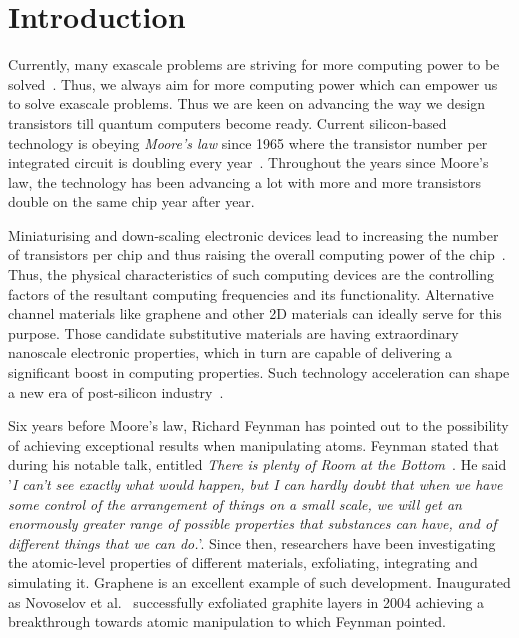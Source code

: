 \chapter{Introduction}
\label{introduction}

Currently, many exascale problems are striving for more computing power to be solved~\cite{Messina2017}. Thus, we always aim for more computing power which can empower us to solve exascale problems. Thus we are keen on advancing the way we design transistors till quantum computers become ready. Current silicon-based technology is obeying \textit{Moore's law} since 1965 where the transistor number per integrated circuit is doubling every year~\cite{Schaller1997, Moore2006}. Throughout the years since Moore's law, the technology has been advancing a lot with more and more transistors double on the same chip year after year. 

Miniaturising and down-scaling electronic devices lead to increasing the number of transistors per chip and thus raising the overall computing power of the chip~\cite{Thiele2017}. Thus, the physical characteristics of such computing devices are the controlling factors of the resultant computing frequencies and its functionality. Alternative channel materials like graphene and other 2D materials can ideally serve for this purpose. Those candidate substitutive materials are having extraordinary nanoscale electronic properties, which in turn are capable of delivering a significant boost in computing properties. Such technology acceleration can shape a new era of post-silicon industry~\cite{Schwierz2010, Geim2007, Taghioskoui2009, Schwierz2011, Kim2011, Schwierz2013}. 

Six years before Moore's law, Richard Feynman has pointed out to the possibility of achieving exceptional results when manipulating atoms. Feynman stated that during his notable talk, entitled \textit{There is plenty of Room at the Bottom}~\cite{Feynman1960}. He said '\textit{I can't see exactly what would happen, but I can hardly doubt that when we have some control of the arrangement of things on a small scale, we will get an enormously greater range of possible properties that substances can have, and of different things that we can do.}'. Since then, researchers have been investigating the atomic-level properties of different materials, exfoliating, integrating and simulating it. Graphene is an excellent example of such development. Inaugurated as Novoselov et al.~\cite{Novoselov2004} successfully exfoliated graphite layers in 2004 achieving a breakthrough towards atomic manipulation to which Feynman pointed. 

